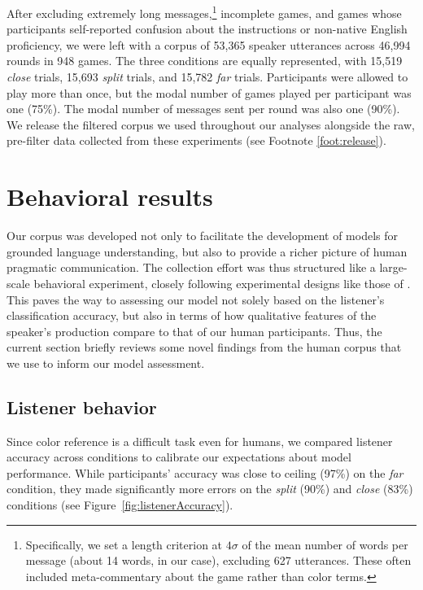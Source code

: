 \documentclass[11pt,letterpaper]{article}
\renewcommand{\|}{\mid}
\newcommand{\figref}[1]{Figure~\ref{#1}}
\newcommand{\cond}{\emph}
\begin{document}
After excluding extremely long messages,\footnote{Specifically, we set a length criterion at $4\sigma$ of the mean number of words per message (about 14 words, in our case), excluding 627 utterances. These often included meta-commentary about the game rather than color terms.} incomplete games, and games whose participants self-reported confusion about the instructions or non-native English proficiency, we were left with a corpus of 53,365 speaker utterances across 46,994 rounds in 948 games. The three conditions are equally represented, with 15,519 \emph{close} trials, 15,693 \emph{split} trials, and 15,782 \emph{far} trials. Participants were allowed to play more than once, but the modal number of games played per participant was one (75\%). The modal number of messages sent per round was also one (90\%). We release the filtered corpus we used throughout our analyses alongside the raw, pre-filter data collected from these experiments (see Footnote
\ref{foot:release}).

\section{Behavioral results}

Our corpus was developed not only to facilitate the development of
models for grounded language understanding, but also to provide a
richer picture of human pragmatic communication. The collection effort
was thus structured like a large-scale behavioral experiment, closely
following experimental designs like those of
. This paves the way to assessing our
model not solely based on the listener's classification accuracy, but also in terms of how
qualitative features of the speaker's production compare to that of our human participants.
Thus, the current section briefly reviews some novel findings from the human
corpus that we use to inform our model assessment.

\subsection{Listener behavior}

Since color reference is a difficult task even for humans, we compared listener accuracy across conditions to calibrate our expectations about model performance. While participants' accuracy was close to ceiling (97\%) on the \cond{far} condition, they made significantly more errors on the \cond{split} (90\%) and \cond{close} (83\%) conditions (see \figref{fig:listenerAccuracy}).
\end{document}
